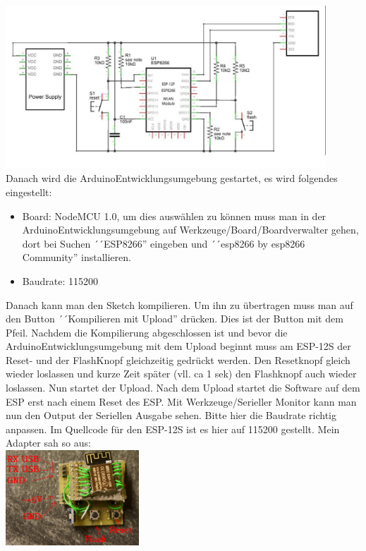 \documentclass[11pt,fleqn]{book} %
\numberwithin{equation}{section} %
\numberwithin{figure}{section} %
\numberwithin{table}{section} %
\begin{document}
\includegraphics[width=12cm]{Pictures/espwiring.jpg}\\
Danach wird die ArduinoEntwicklungsumgebung gestartet, es wird folgendes eingestellt:
\begin{itemize}
 \item Board: NodeMCU 1.0, um dies auswählen zu können muss man in der ArduinoEntwicklungsumgebung auf Werkzeuge/Board/Boardverwalter gehen, dort bei Suchen ´´ESP8266'' eingeben und ´´esp8266 by esp8266 Community'' installieren.
 \item Baudrate: 115200
\end{itemize}
Danach kann man den Sketch kompilieren. Um ihn zu übertragen muss man auf den Button ´´Kompilieren mit Upload'' drücken. Dies ist der Button mit dem Pfeil. Nachdem die Kompilierung abgeschlossen ist und bevor die ArduinoEntwicklungsumgebung mit dem Upload beginnt muss am ESP-12S der Reset- und der FlashKnopf gleichzeitig gedrückt werden. Den Resetknopf gleich wieder loslassen und kurze Zeit später (vll. ca 1 sek) den Flashknopf auch wieder loslassen. Nun startet der Upload. Nach dem Upload startet die Software auf dem ESP erst nach einem Reset des ESP. Mit Werkzeuge/Serieller Monitor kann man nun den Output der Seriellen Ausgabe sehen. Bitte hier die Baudrate richtig anpassen. Im Quellcode für den ESP-12S ist es hier auf 115200 gestellt. Mein Adapter sah so aus:\\
\includegraphics[width=5cm]{Pictures/DSC01318.jpg}
\end{document}
